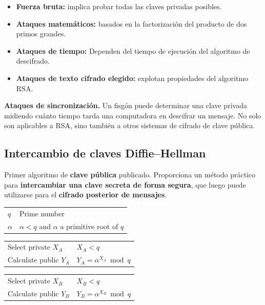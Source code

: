 \documentclass[11pt,a4paper]{article}
\begin{document}
\begin{itemize}
    \item \textbf{Fuerza bruta:} implica probar todas las claves privadas posibles.
    \item \textbf{Ataques matemáticos:} basados en la factorización del producto de dos primos grandes.
    \item \textbf{Ataques de tiempo:} Dependen del tiempo de ejecución del algoritmo de descifrado.
    \item \textbf{Ataques de texto cifrado elegido:} explotan propiedades del algoritmo RSA.
\end{itemize}

\begin{NotaBox}
\textbf{Ataques de sincronización.} Un fisgón puede determinar una clave privada midiendo cuánto tiempo tarda una computadora en descifrar un mensaje. No solo son aplicables a RSA, sino también a otros sistemas de cifrado de clave pública.
\end{NotaBox}

\subsection{Intercambio de claves Diffie--Hellman}

Primer algoritmo de \textbf{clave pública} publicado.
Proporciona un método práctico para \textbf{intercambiar una clave secreta de forma segura}, que luego puede utilizarse para el \textbf{cifrado posterior de mensajes}.

\begin{tcolorbox}[colback=gray!15,colframe=black,title=\textbf{Global Public Elements}]
\begin{tabular}{ll}
$q$ & Prime number \\
$\alpha$ & $\alpha < q$ and $\alpha$ a primitive root of $q$
\end{tabular}
\end{tcolorbox}

\begin{tcolorbox}[colback=gray!15,colframe=black,title=\textbf{User A Key Generation}]
\begin{tabular}{ll}
Select private $X_A$ & $X_A < q$ \\
Calculate public $Y_A$ & $Y_A = \alpha^{X_A} \bmod q$
\end{tabular}
\end{tcolorbox}

\begin{tcolorbox}[colback=gray!15,colframe=black,title=\textbf{User B Key Generation}]
\begin{tabular}{ll}
Select private $X_B$ & $X_B < q$ \\
Calculate public $Y_B$ & $Y_B = \alpha^{X_B} \bmod q$
\end{tabular}
\end{tcolorbox}
\end{document}
